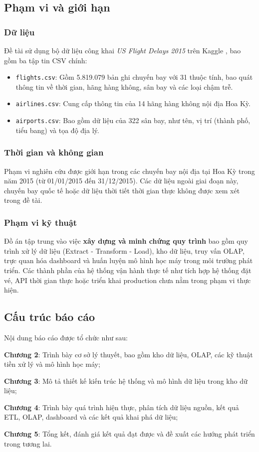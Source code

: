 \subsection{Phạm vi và giới hạn}

\subsubsection{Dữ liệu}
Đề tài sử dụng bộ dữ liệu công khai \textit{US Flight Delays 2015} trên Kaggle \cite{kaggle2015}, bao gồm ba tập tin CSV chính:
\begin{itemize}
    \item \texttt{flights.csv}: Gồm 5.819.079 bản ghi chuyến bay với 31 thuộc tính, bao quát thông tin về thời gian, hãng hàng không, sân bay và các loại chậm trễ.
    \item \texttt{airlines.csv}: Cung cấp thông tin của 14 hãng hàng không nội địa Hoa Kỳ.
    \item \texttt{airports.csv}: Bao gồm dữ liệu của 322 sân bay, như tên, vị trí (thành phố, tiểu bang) và tọa độ địa lý.
\end{itemize}

\subsubsection{Thời gian và không gian}
Phạm vi nghiên cứu được giới hạn trong các chuyến bay nội địa tại Hoa Kỳ trong năm 2015 (từ 01/01/2015 đến 31/12/2015). Các dữ liệu ngoài giai đoạn này, chuyến bay quốc tế hoặc dữ liệu thời tiết thời gian thực không được xem xét trong đề tài.

\subsubsection{Phạm vi kỹ thuật}
Đồ án tập trung vào việc \textbf{xây dựng và minh chứng quy trình} bao gồm quy trình xử lý dữ liệu (Extract - Transform - Load), kho dữ liệu, truy vấn OLAP, trực quan hóa dashboard và huấn luyện mô hình học máy trong môi trường phát triển. Các thành phần của hệ thống vận hành thực tế như tích hợp hệ thống đặt vé, API thời gian thực hoặc triển khai production chưa nằm trong phạm vi thực hiện.

\subsection{Cấu trúc báo cáo}

Nội dung báo cáo được tổ chức như sau:

\textbf{Chương 2}: Trình bày cơ sở lý thuyết, bao gồm kho dữ liệu, OLAP, các kỹ thuật tiền xử lý và mô hình học máy;

\textbf{Chương 3}: Mô tả thiết kế kiến trúc hệ thống và mô hình dữ liệu trong kho dữ liệu;

\textbf{Chương 4}: Trình bày quá trình hiện thực, phân tích dữ liệu nguồn, kết quả ETL, OLAP, dashboard và các kết quả khai phá dữ liệu;

\textbf{Chương 5}: Tổng kết, đánh giá kết quả đạt được và đề xuất các hướng phát triển trong tương lai.
